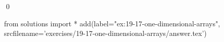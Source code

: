 
\begin{ex}
  \label{ex:19-17-one-dimensional-arrays}
  
  \qed
\end{ex}
\begin{python0}
from solutions import *
add(label="ex:19-17-one-dimensional-arrays",
    srcfilename='exercises/19-17-one-dimensional-arrays/answer.tex')
\end{python0}

